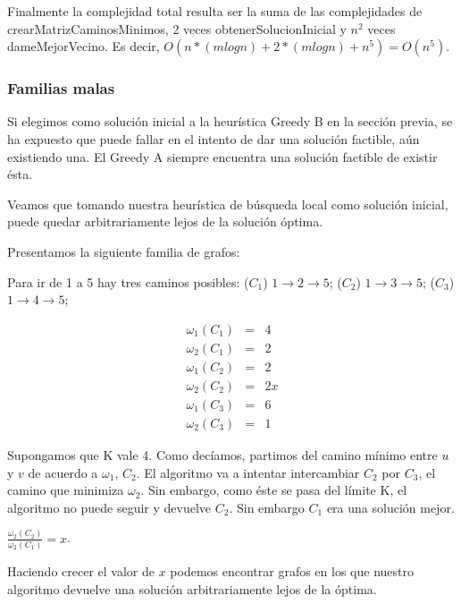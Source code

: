 Finalmente la complejidad total resulta ser la suma de las complejidades de crearMatrizCaminosMinimos, 2 veces obtenerSolucionInicial y $n^2$ veces dameMejorVecino. Es decir, $O(n * (m log n) + 2 * (m log n) + n^5) = O(n^5)$.

\subsubsection{Familias malas}

Si elegimos como solución inicial a la heurística Greedy B en la sección previa, se ha expuesto que puede fallar en el intento de dar una solución factible, aún existiendo una. El Greedy A siempre encuentra una solución factible de existir ésta. 

Veamos que tomando nuestra heurística de búsqueda local como solución inicial, puede quedar arbitrariamente lejos de la solución óptima.

Presentamos la siguiente familia de grafos:


Para ir de 1 a 5 hay tres caminos posibles: ($C_1$) $1 \rightarrow 2 \rightarrow 5$; ($C_2$) $1 \rightarrow 3 \rightarrow 5$;
($C_3$) $1 \rightarrow 4 \rightarrow 5$;

\begin{eqnarray}
 \omega_1(C_1) &=& 4	\\ 
 \omega_2(C_1) &=& 2	\\
 \omega_1(C_2) &=& 2	\\
 \omega_2(C_2) &=& 2x   \\
 \omega_1(C_3) &=& 6	\\
 \omega_2(C_3) &=& 1
\end{eqnarray}

Supongamos que K vale 4.
Como decíamos, partimos del camino mínimo entre $u$ y $v$ de acuerdo a $\omega_1$, $C_2$. El algoritmo va a intentar intercambiar $C_2$ por
$C_3$, el camino que minimiza $\omega_2$. Sin embargo, como éste se pasa del límite K, el algoritmo no puede seguir y devuelve $C_2$. Sin
embargo $C_1$ era una solución mejor.

$\frac{\omega_2(C_2)}{\omega_2(C_1)} = x$.

Haciendo crecer el valor de $x$ podemos encontrar grafos en los que nuestro algoritmo devuelve una
solución arbitrariamente lejos de la óptima.


